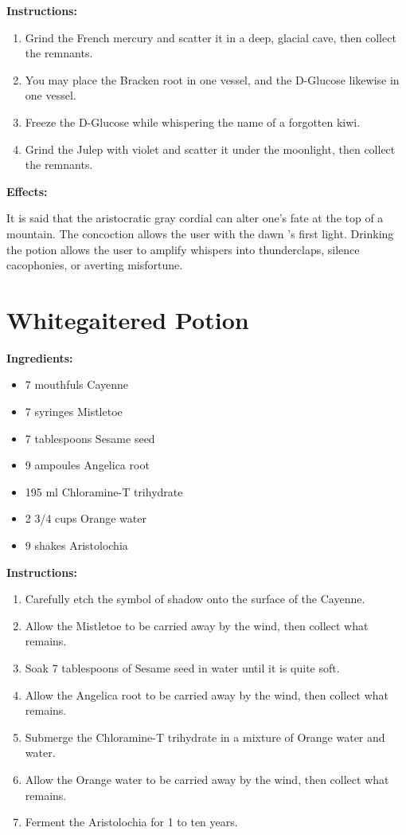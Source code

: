 \documentclass{article}
\begin{document}
\textbf{Instructions:}

\begin{enumerate}
  \item Grind the French mercury and scatter it in a deep, glacial cave, then collect the remnants.
  \item You may place the Bracken root in one vessel, and the D-Glucose likewise in one vessel.
  \item Freeze the D-Glucose while whispering the name of a forgotten kiwi.
  \item Grind the Julep with violet and scatter it under the moonlight, then collect the remnants.
\end{enumerate}

\textbf{Effects:}

It is said that the aristocratic gray cordial can alter one's fate at the top of a mountain. The concoction allows the user with the dawn 's first light. Drinking the potion allows the user to amplify whispers into thunderclaps, silence cacophonies, or averting misfortune.

\newpage
\section*{Whitegaitered Potion}

\textbf{Ingredients:}

\begin{itemize}
  \item 7 mouthfuls Cayenne
  \item 7 syringes Mistletoe
  \item 7 tablespoons Sesame seed
  \item 9 ampoules Angelica root
  \item 195 ml Chloramine-T trihydrate
  \item 2 3/4 cups Orange water
  \item 9 shakes Aristolochia
\end{itemize}

\textbf{Instructions:}

\begin{enumerate}
  \item Carefully etch the symbol of shadow onto the surface of the Cayenne.
  \item Allow the Mistletoe to be carried away by the wind, then collect what remains.
  \item Soak 7 tablespoons of Sesame seed in water until it is quite soft.
  \item Allow the Angelica root to be carried away by the wind, then collect what remains.
  \item Submerge the Chloramine-T trihydrate in a mixture of Orange water and water.
  \item Allow the Orange water to be carried away by the wind, then collect what remains.
  \item Ferment the Aristolochia for 1 to ten years.
\end{enumerate}
\end{document}
